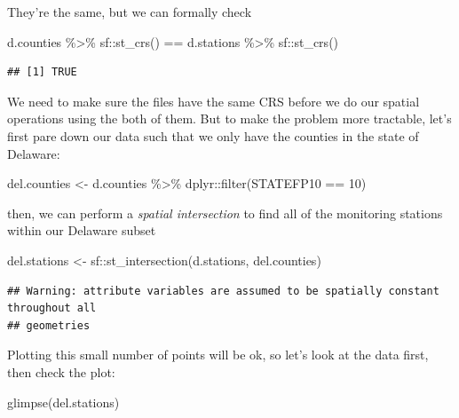 \documentclass[]{article}
\newenvironment{Shaded}{\begin{snugshade}}{\end{snugshade}}
\newcommand{\DecValTok}[1]{\textcolor[rgb]{0.00,0.00,0.81}{#1}}
\newcommand{\FunctionTok}[1]{\textcolor[rgb]{0.00,0.00,0.00}{#1}}
\newcommand{\NormalTok}[1]{#1}
\newcommand{\OtherTok}[1]{\textcolor[rgb]{0.56,0.35,0.01}{#1}}
\newcommand{\SpecialCharTok}[1]{\textcolor[rgb]{0.00,0.00,0.00}{#1}}
\begin{document}
They're the same, but we can formally check

\begin{Shaded}
\begin{Highlighting}[]
\NormalTok{d.counties }\SpecialCharTok{\%\textgreater{}\%}\NormalTok{ sf}\SpecialCharTok{::}\FunctionTok{st\_crs}\NormalTok{() }\SpecialCharTok{==}\NormalTok{ d.stations }\SpecialCharTok{\%\textgreater{}\%}\NormalTok{ sf}\SpecialCharTok{::}\FunctionTok{st\_crs}\NormalTok{()}
\end{Highlighting}
\end{Shaded}

\begin{verbatim}
## [1] TRUE
\end{verbatim}

We need to make sure the files have the same CRS before we do our
spatial operations using the both of them. But to make the problem more
tractable, let's first pare down our data such that we only have the
counties in the state of Delaware:

\begin{Shaded}
\begin{Highlighting}[]
\NormalTok{del.counties }\OtherTok{\textless{}{-}}\NormalTok{ d.counties }\SpecialCharTok{\%\textgreater{}\%}\NormalTok{ dplyr}\SpecialCharTok{::}\FunctionTok{filter}\NormalTok{(STATEFP10 }\SpecialCharTok{==} \DecValTok{10}\NormalTok{)}
\end{Highlighting}
\end{Shaded}

then, we can perform a \emph{spatial intersection} to find all of the
monitoring stations within our Delaware subset

\begin{Shaded}
\begin{Highlighting}[]
\NormalTok{del.stations }\OtherTok{\textless{}{-}}\NormalTok{ sf}\SpecialCharTok{::}\FunctionTok{st\_intersection}\NormalTok{(d.stations, del.counties)}
\end{Highlighting}
\end{Shaded}

\begin{verbatim}
## Warning: attribute variables are assumed to be spatially constant throughout all
## geometries
\end{verbatim}

Plotting this small number of points will be ok, so let's look at the
data first, then check the plot:

\begin{Shaded}
\begin{Highlighting}[]
\FunctionTok{glimpse}\NormalTok{(del.stations)}
\end{Highlighting}
\end{Shaded}
\end{document}
